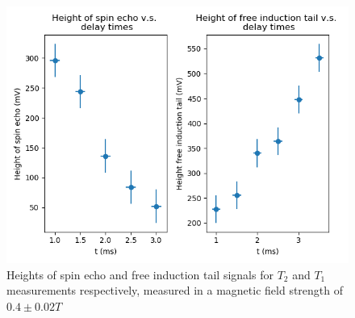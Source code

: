 \documentclass[a4paper, 12pt]{article}  %
\begin{document}
\begin{figure}[H]
    \centering
    \includegraphics[scale=0.65]{raw_data.png}
    \caption{Heights of spin echo and free induction tail signals for $T_2$ and $T_1$ measurements respectively, measured in a magnetic field strength of $0.4 \pm 0.02 T$}
    \label{fig:raw_data}
\end{figure}
\end{document}

